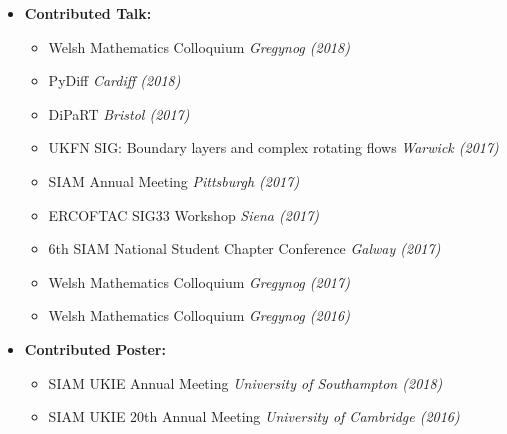 \documentclass[10pt,a4paper,sans]{moderncv}        %
\begin{document}
\begin{itemize}
		\item{\textbf{Contributed Talk:}
				\small{
					\begin{itemize}
						\vspace{3pt}
						\item Welsh Mathematics Colloquium \hfill \textit{Gregynog (2018)}
						\vspace{3pt}
						\item PyDiff \hfill \textit{Cardiff (2018)}
						\vspace{3pt}
						\item DiPaRT \hfill \textit{Bristol (2017)}
						\vspace{3pt}
						\item UKFN SIG: Boundary layers and complex rotating flows \hfill \textit{Warwick (2017)}
						\vspace{3pt}
						\item SIAM Annual Meeting \hfill \textit{Pittsburgh (2017)}
						\vspace{3pt}
						\item ERCOFTAC SIG33 Workshop \hfill \textit{Siena (2017)}
						\vspace{3pt}
						\item 6th SIAM National Student Chapter Conference \hfill \textit{Galway (2017)}
						\vspace{3pt}
						\item Welsh Mathematics Colloquium \hfill \textit{Gregynog (2017)}
						\vspace{3pt}
						\item Welsh Mathematics Colloquium \hfill \textit{Gregynog (2016)}
		\end{itemize}}
	}
		\vspace{6pt}
		\item{\textbf{Contributed Poster:}
			\small{
				\begin{itemize}
					\vspace{3pt}
					\item SIAM UKIE Annual Meeting \hfill \textit{University of Southampton (2018)}
					\vspace{3pt}
					\item SIAM UKIE 20th Annual Meeting \hfill \textit{University of Cambridge (2016)}
		\end{itemize}}}
		
	\end{itemize}
\end{document}
